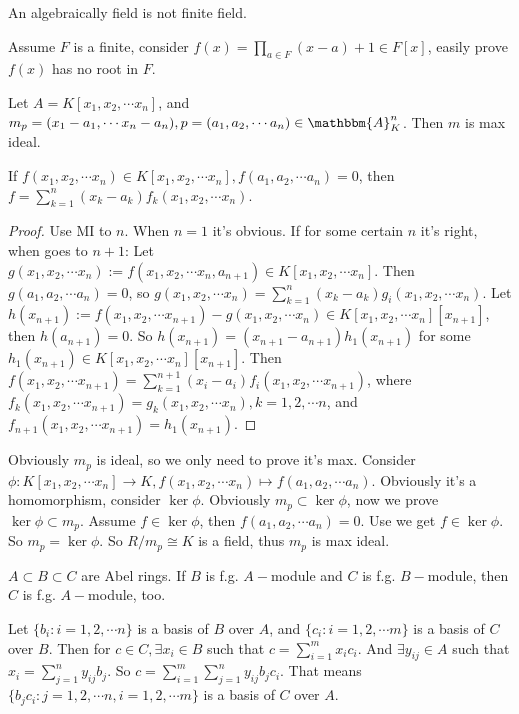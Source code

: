 \documentclass{ctexart}
\newcommand\<{\langle}
\renewcommand\>{\rangle}
\def\to{\rightarrow}
\newcommand{\A}{\mathbbm{A}}
\begin{document}
\begin{problem}
    An algebraically field is not finite field. 
\end{problem}
\begin{solution}
    Assume $F$ is a finite, consider $f(x)=\prod_{a\in F}(x-a)+1\in F[x]$, easily prove $f(x)$ has no root in $F$. 
\end{solution}
\begin{problem}
    Let $A=K[x_1,x_2,\cdots x_n]$, and $m_p=(x_1-a_1,\cdots x_n-a_n),p=(a_1,a_2,\cdots a_n)\in\A_K^n$. Then $m$ is max ideal.
\end{problem}
\begin{lemma}
    \label{lem:ker}
    If $f(x_1,x_2,\cdots x_n)\in K[x_1,x_2,\cdots x_n],f(a_1,a_2,\cdots a_n)=0$, then $f=\sum_{k=1}^n (x_k-a_k)f_k(x_1,x_2,\cdots x_n)$. 
\end{lemma}
\begin{proof}
    Use MI to $n$. When $n=1$ it's obvious. If for some certain $n$ it's right, when goes to $n+1$: Let $g(x_1,x_2,\cdots x_n):=f(x_1,x_2,\cdots x_n,a_{n+1})\in K[x_1,x_2,\cdots x_n]$. Then $g(a_1,a_2,\cdots a_n)=0$, so $g(x_1,x_2,\cdots x_n)=\sum_{k=1}^n (x_k-a_k)g_i(x_1,x_2,\cdots x_n)$. Let $h(x_{n+1}):=f(x_1,x_2,\cdots x_{n+1})-g(x_1,x_2,\cdots x_n)\in K[x_1,x_2,\cdots x_n][x_{n+1}]$, then $h(a_{n+1})=0$. So $h(x_{n+1})=(x_{n+1}-a_{n+1})h_1(x_{n+1})$ for some $h_1(x_{n+1})\in K[x_1,x_2,\cdots x_n][x_{n+1}]$. Then $f(x_1,x_2,\cdots x_{n+1})=\sum_{k=1}^{n+1}(x_{i}-a_i)f_i(x_1,x_2,\cdots x_{n+1})$, where $f_k(x_1,x_2,\cdots x_{n+1})=g_k(x_1,x_2,\cdots x_n),k=1,2,\cdots n$, and $f_{n+1}(x_1,x_2,\cdots x_{n+1})=h_1(x_{n+1})$. 
\end{proof}
\begin{solution}
    Obviously $m_p$ is ideal, so we only need to prove it's max. Consider $\phi:K[x_1,x_2,\cdots x_n]\to K,f(x_1,x_2,\cdots x_n)\mapsto f(a_1,a_2,\cdots a_n)$. Obviously it's a homomorphism, consider $\ker \phi$. Obviously $m_p\subset \ker \phi$, now we prove $\ker \phi\subset m_p$. Assume $f\in\ker\phi$, then $f(a_1,a_2,\cdots a_n)=0$. Use  we get $f\in\ker\phi$. So $m_p=\ker \phi$. So $R/m_p\cong K$ is a field, thus $m_p$ is max ideal. 
\end{solution}

\begin{problem}
    $A\subset B\subset C$ are Abel rings. If $B$ is f.g. $A-$module and $C$ is f.g. $B-$module, then $C$ is f.g. $A-$module, too.  
\end{problem}
\begin{solution}
    Let $\{b_i:i=1,2,\cdots n\}$ is a basis of $B$ over $A$, and $\{c_i:i=1,2,\cdots m\}$ is a basis of $C$ over $B$. Then for $c\in C,\exists x_i\in B$ such that $c=\sum_{i=1}^m x_i c_i$. And $\exists y_{ij}\in A$ such that $x_i=\sum_{j=1}^n y_{ij} b_j$. So $c=\sum_{i=1}^m\sum_{j=1}^n y_{ij} b_jc_i$. That means $\{b_jc_i:j=1,2,\cdots n,i=1,2,\cdots m\}$ is a basis of $C$ over $A$. 
\end{solution}
\end{document}
